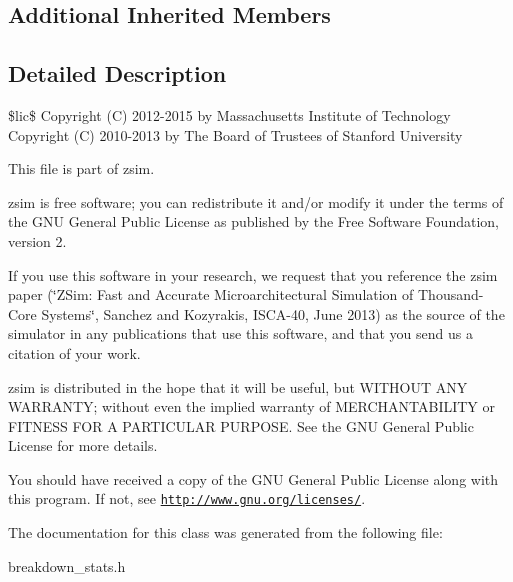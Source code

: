 \subsection*{Additional Inherited Members}


\subsection{Detailed Description}
\$lic\$ Copyright (C) 2012-\/2015 by Massachusetts Institute of Technology Copyright (C) 2010-\/2013 by The Board of Trustees of Stanford University

This file is part of zsim.

zsim is free software; you can redistribute it and/or modify it under the terms of the G\-N\-U General Public License as published by the Free Software Foundation, version 2.

If you use this software in your research, we request that you reference the zsim paper (\char`\"{}\-Z\-Sim\-: Fast and Accurate Microarchitectural Simulation of
\-Thousand-\/\-Core Systems\char`\"{}, Sanchez and Kozyrakis, I\-S\-C\-A-\/40, June 2013) as the source of the simulator in any publications that use this software, and that you send us a citation of your work.

zsim is distributed in the hope that it will be useful, but W\-I\-T\-H\-O\-U\-T A\-N\-Y W\-A\-R\-R\-A\-N\-T\-Y; without even the implied warranty of M\-E\-R\-C\-H\-A\-N\-T\-A\-B\-I\-L\-I\-T\-Y or F\-I\-T\-N\-E\-S\-S F\-O\-R A P\-A\-R\-T\-I\-C\-U\-L\-A\-R P\-U\-R\-P\-O\-S\-E. See the G\-N\-U General Public License for more details.

You should have received a copy of the G\-N\-U General Public License along with this program. If not, see \href{http://www.gnu.org/licenses/}{\tt http\-://www.\-gnu.\-org/licenses/}. 

The documentation for this class was generated from the following file\-:\begin{DoxyCompactItemize}
\item 
breakdown\-\_\-stats.\-h\end{DoxyCompactItemize}
